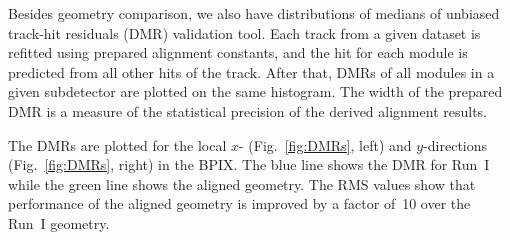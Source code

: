 Besides geometry comparison, we also have distributions of medians of unbiased track-hit residuals (DMR) validation tool. Each track from a given dataset is refitted using prepared alignment constants, and the hit for each module is predicted from all other hits of the track. After that, DMRs of all modules in a given subdetector are plotted on the same histogram. The width of the prepared DMR is a measure of the statistical precision of the derived alignment results. 


The DMRs are plotted for the local $x$- (Fig.~\ref{fig:DMRs}, left) and $y$-directions (Fig.~\ref{fig:DMRs}, right) in the BPIX. The blue line shows the DMR for Run~I while the green line shows the aligned geometry. The RMS values show that performance of the aligned geometry is improved by a factor of~10 over the Run~I geometry.

